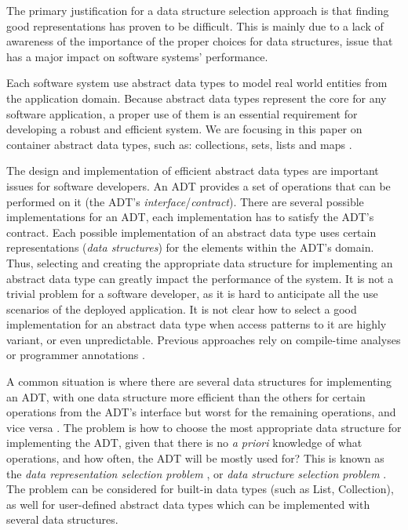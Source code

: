 The primary justification for a data structure selection
approach is that finding good representations
has proven to be difficult. This is mainly due to a lack of awareness of the importance
of the proper choices for data structures, issue that has a major impact on software systems' performance.

Each software system use abstract data types \cite{adt} to model real world entities from the application domain. Because abstract data types represent the core for any software application, a proper use of them is an essential requirement for developing a robust and efficient system.  We are focusing in this paper on container abstract data types, such as: collections, sets, lists and maps \cite{Cormen09Introduction}.

The design and implementation of efficient abstract data types are important issues for software developers. An ADT provides a set of operations that can be performed on it (the ADT's \emph{interface}/\emph{contract}). There are several possible implementations for an ADT, each implementation has to satisfy the ADT's contract. Each possible implementation of an abstract data type uses certain representations (\emph{data structures}) for the elements within the ADT's domain. Thus, selecting and creating the appropriate data structure for implementing an abstract data type can greatly impact the performance of the system. It is not a trivial problem for a software developer, as it is hard to anticipate all the use scenarios of the deployed application. It is not clear how to select a good implementation
for an abstract data type when access patterns to it are
highly variant, or even unpredictable. Previous approaches rely on compile-time analyses or programmer annotations \cite{chuang}.

A common situation is where there are several data structures for implementing an ADT,
with one data structure more efficient than the others for
certain operations from the ADT's interface but worst for the remaining operations,
and vice versa \cite{chuang}. The problem is how to choose the most appropriate data structure for implementing the ADT,
given that there is no \emph{a priori} knowledge of what operations,
and how often, the ADT will be mostly used for?
This is known as the \emph{data representation selection problem} \cite{sch}, or \emph{data structure selection problem} \cite{31}.
The problem can be considered for built-in data types (such as List, Collection), as well for user-defined abstract data types which can be implemented with several data structures.

